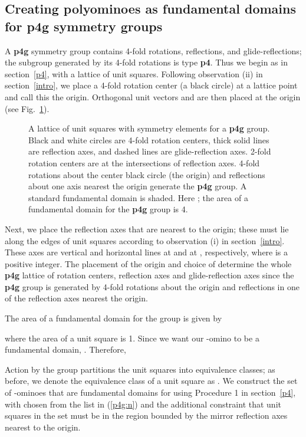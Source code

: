 \documentclass{ws-ijcga}
\begin{document}
\subsection{Creating polyominoes as fundamental domains for {\bf p4g} symmetry groups}
\label{p4gcre}
A {\bf p4g} symmetry group contains 4-fold rotations, reflections, and glide-reflections; the
subgroup generated by its 4-fold rotations is type {\bf p4}. 
Thus we begin as in section~\ref{p4},
with a lattice of unit squares. 
Following observation (ii) in section~\ref{intro}, 
we place a 4-fold rotation center (a black circle) at a lattice point and call this the origin. 
Orthogonal unit vectors  and  are then placed at the origin (see Fig.~\ref{fig:p4glattice}).
\begin{figure}[h]
\centerline{}
\caption{
A lattice of unit squares with symmetry elements for a {\bf p4g} group. 
Black and white circles are 4-fold rotation centers, thick solid lines are reflection axes, 
and dashed lines are glide-reflection axes. 2-fold
rotation centers are at the intersections of reflection axes. 
4-fold rotations about the center black circle (the
origin) and reflections about one axis nearest the origin generate the {\bf p4g} group. 
A standard fundamental
domain is shaded. Here ; the area of a fundamental domain for the {\bf p4g} group is 4.
\label{fig:p4glattice}
}
\end{figure}

Next, we place the reflection axes that are nearest to the origin; 
these must lie along the edges of unit squares according to observation (i) in section~\ref{intro}. 
These axes are vertical and horizontal lines at  and at , respectively, 
where  is a positive integer. 
The placement of the origin and choice of  determine the whole {\bf p4g} lattice of rotation
centers, reflection axes and glide-reflection axes since the {\bf p4g} group  is generated 
by 4-fold rotations about the origin and reflections in one of the reflection axes nearest the
origin.

The area  of a fundamental domain for the group  is given by
  
where the area of a unit square is 1. Since we want our -omino to be a fundamental
domain, . Therefore,
  

Action by the group  partitions the unit squares into  equivalence classes; as before, we
denote the equivalence class of a unit square  as . 
We construct the set  of -ominoes
that are fundamental domains for  using Procedure 1 in section~\ref{p4}, 
with  chosen from the list in (\ref{p4g:n}) and the additional constraint that unit squares in the set  must
be in the region bounded by the mirror reflection axes nearest to the origin.
\end{document}
